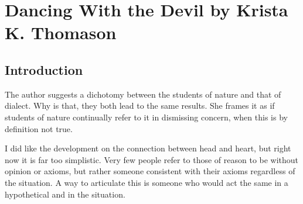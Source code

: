 \section{Dancing With the Devil by Krista K. Thomason}

\subsection{Introduction}

The author suggests a dichotomy between the students of nature and that of dialect. Why is that, they both lead to the same results. She frames it as if students of nature continually refer to it in dismissing concern, when this is by definition not true.

I did like the development on the connection between head and heart, but right now it is far too simplistic. Very few people refer to those of reason to be without opinion or axioms, but rather someone consistent with their axioms regardless of the situation. A way to articulate this is someone who would act the same in a hypothetical and in the situation.
